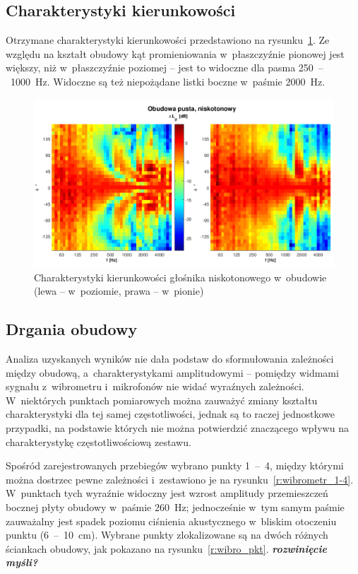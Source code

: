 \documentclass[12pt]{oska}
\newcommand{\range}[2]{\num{#1}~--~\num{#2}}
\newcommand{\comment}[1]{{\color{magenta}\emph{\textbf{#1}}}}
\begin{document}
	\subsection{Charakterystyki kierunkowości}
	
		Otrzymane charakterystyki kierunkowości przedstawiono na rysunku~\ref{r:kierunkowosc}. Ze względu na kształt obudowy kąt promieniowania w~płaszczyźnie pionowej jest większy, niż w~płaszczyźnie poziomej -- jest to widoczne dla pasma \range{250}{1000}~\si{\hertz}. Widoczne są też niepożądane listki boczne w~paśmie \SI{2000}{\hertz}.
		
		\begin{figure}[!ht]
			\centering
			\includegraphics[width=\textwidth,trim={0 .5cm 0 1.7cm},clip]{kierunkowosc.png}
			\caption{Charakterystyki kierunkowości głośnika niskotonowego w~obudowie (lewa -- w~poziomie, prawa -- w~pionie)}
			\label{r:kierunkowosc}
		\end{figure}

	
	\subsection{Drgania obudowy}
		
		Analiza uzyskanych wyników nie dała podstaw do sformułowania zależności między obudową, a~charakterystykami amplitudowymi -- pomiędzy widmami sygnału z~wibrometru i~mikrofonów nie widać wyraźnych zależności. W~niektórych punktach pomiarowych można zauważyć zmiany kształtu charakterystyki dla tej samej częstotliwości, jednak są to raczej jednostkowe przypadki, na podstawie których nie można potwierdzić znaczącego wpływu na charakterystykę częstotliwościową zestawu.
		
		Spośród zarejestrowanych przebiegów wybrano punkty \range{1}{4}, między którymi można dostrzec pewne zależności i~zestawiono je na rysunku~\ref{r:wibrometr_1-4}. W~punktach tych wyraźnie widoczny jest wzrost amplitudy przemieszczeń bocznej płyty obudowy w~paśmie \SI{260}{\hertz}; jednocześnie w~tym samym paśmie zauważalny jest spadek poziomu ciśnienia akustycznego w~bliskim otoczeniu punktu (\range{6}{10}~\si{\cm}). Wybrane punkty zlokalizowane są na dwóch różnych ściankach obudowy, jak pokazano na rysunku~\ref{r:wibro_pkt}.  \comment{rozwinięcie myśli?}
		
\end{document}
